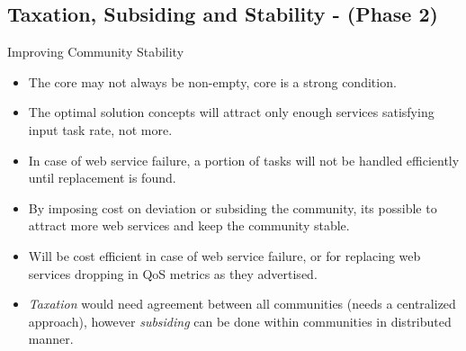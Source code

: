\documentclass{beamer}
\begin{document}
\subsection{Taxation, Subsiding and Stability - (Phase 2)}
\begin{frame}{Improving Community Stability}
    \begin{itemize}
        \item The core may not always be non-empty, core is a strong condition.
        \item The optimal solution concepts will attract only enough services satisfying input task rate, not more.
        \item In case of web service failure, a portion of tasks will not be handled efficiently until replacement is found.
        \item By imposing cost on deviation or subsiding the community, its possible to attract more web services and keep the community stable.
        \item Will be cost efficient in case of web service failure, or for replacing web services dropping in QoS metrics as they advertised.
        \item \emph{Taxation} would need agreement between all communities (needs a centralized approach), however \emph{subsiding} can be done within communities in distributed manner. 
    \end{itemize}
\end{frame}
\end{document}
